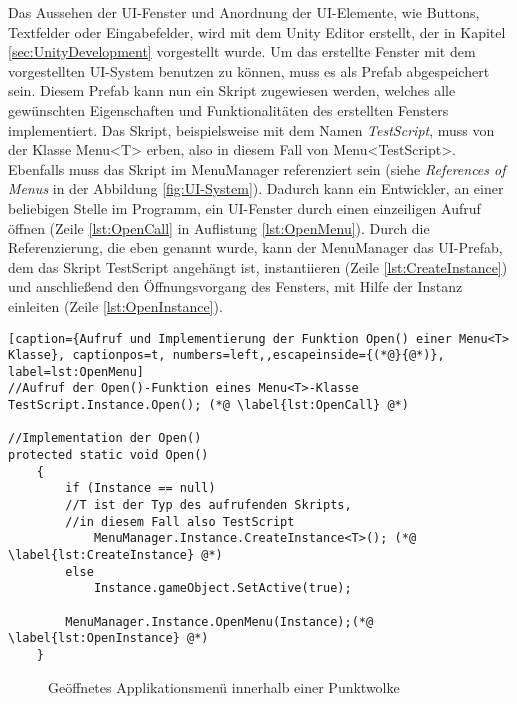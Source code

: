 Das Aussehen der UI-Fenster und Anordnung der UI-Elemente, wie Buttons, Textfelder oder Eingabefelder, wird mit dem Unity Editor erstellt, der in Kapitel \ref{sec:UnityDevelopment} vorgestellt wurde. Um das erstellte Fenster mit dem vorgestellten UI-System benutzen zu können, muss es als Prefab abgespeichert sein. Diesem Prefab kann nun ein Skript zugewiesen werden, welches alle gewünschten Eigenschaften und Funktionalitäten des erstellten Fensters implementiert. Das Skript, beispielsweise mit dem Namen \textit{TestScript}, muss von der Klasse Menu<T> erben, also in diesem Fall von Menu<TestScript>. Ebenfalls muss das Skript im MenuManager referenziert sein (siehe \textit{References of Menus} in der Abbildung \ref{fig:UI-System}). Dadurch kann ein Entwickler, an einer beliebigen Stelle im Programm, ein UI-Fenster durch einen einzeiligen Aufruf öffnen (Zeile \ref{lst:OpenCall} in Auflistung \ref{lst:OpenMenu}). Durch die Referenzierung, die eben genannt wurde, kann der MenuManager das UI-Prefab, dem das Skript TestScript angehängt ist, instantiieren (Zeile \ref{lst:CreateInstance}) und anschließend den Öffnungsvorgang des Fensters, mit Hilfe der Instanz einleiten (Zeile \ref{lst:OpenInstance}). 

\begin{lstlisting}[caption={Aufruf und Implementierung der Funktion Open() einer Menu<T> Klasse}, captionpos=t, numbers=left,,escapeinside={(*@}{@*)}, label=lst:OpenMenu]
//Aufruf der Open()-Funktion eines Menu<T>-Klasse
TestScript.Instance.Open(); (*@ \label{lst:OpenCall} @*)

//Implementation der Open()
protected static void Open()
    {
        if (Instance == null)
		//T ist der Typ des aufrufenden Skripts, 
		//in diesem Fall also TestScript
            MenuManager.Instance.CreateInstance<T>(); (*@ \label{lst:CreateInstance} @*)
        else
            Instance.gameObject.SetActive(true);

        MenuManager.Instance.OpenMenu(Instance);(*@ \label{lst:OpenInstance} @*)
    }
\end{lstlisting}
\quad

\begin{figure}%
	\centering
    \caption{Geöffnetes Applikationsmenü innerhalb einer Punktwolke}
    \label{fig:UiInSession}
\end{figure}


